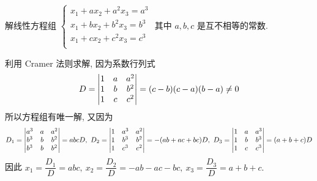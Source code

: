 \begin{example}[2005 华中科技大学]
    解线性方程组 $\begin{cases}
            x_1+ax_2+a^2x_3=a^3 \\
            x_1+bx_2+b^2x_3=b^3 \\
            x_1+cx_2+c^2x_3=c^3 \\
        \end{cases}$
    其中 $a,b,c$ 是互不相等的常数.
\end{example}
\begin{solution}
    利用 Cramer 法则求解, 因为系数行列式 $$D=\mqty|1&a&a^2\\1&b&b^2\\1&c&c^2|=(c-b)(c-a)(b-a)\neq0$$
    所以方程组有唯一解, 又因为
    $$D_1=\mqty|a^3&a&a^2\\b^3&b&b^2\\b^3&b&b^2|=abcD,~D_2=\mqty|1&a^3&a^2\\1&b^3&b^2\\1&c^3&c^2|=-(ab+ac+bc)D,~D_3=\mqty|1&a&a^3\\1&b&b^3\\1&c&c^3|=(a+b+c)D$$
    因此 $x_1=\dfrac{D_1}{D}=abc,~x_2=\dfrac{D_2}{D}=-ab-ac-bc,~x_3=\dfrac{D_3}{D}=a+b+c.$
\end{solution}
